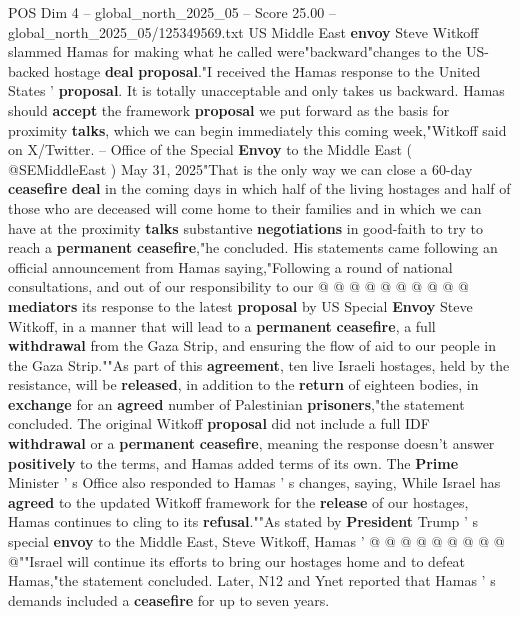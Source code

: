 \begin{textsample}{POS Dim 4 – global\_north\_2025\_05 – Score 25.00 – global\_north\_2025\_05/125349569.txt}  \label{ex:f4_pos_216}
US Middle East \textbf{envoy} Steve Witkoff slammed Hamas for making what he called were"backward"changes to the US-backed hostage \textbf{deal} \textbf{proposal}."I received the Hamas response to the United States ' \textbf{proposal}.
It is totally unacceptable and only takes us backward.
Hamas should \textbf{accept} the framework \textbf{proposal} we put forward as the basis for proximity \textbf{talks}, which we can begin immediately this coming week,"Witkoff said on X/Twitter. -- Office of the Special \textbf{Envoy} to the Middle East ( @SEMiddleEast ) May 31, 2025"That is the only way we can close a 60-day \textbf{ceasefire} \textbf{deal} in the coming days in which half of the living hostages and half of those who are deceased will come home to their families and in which we can have at the proximity \textbf{talks} substantive \textbf{negotiations} in good-faith to try to reach a \textbf{permanent} \textbf{ceasefire},"he concluded.
His statements came following an official announcement from Hamas saying,"Following a round of national consultations, and out of our responsibility to our @ @ @ @ @ @ @ @ @ @ \textbf{mediators} its response to the latest \textbf{proposal} by US Special \textbf{Envoy} Steve Witkoff, in a manner that will lead to a \textbf{permanent} \textbf{ceasefire}, a full \textbf{withdrawal} from the Gaza Strip, and ensuring the flow of aid to our people in the Gaza Strip.""As part of this \textbf{agreement}, ten live Israeli hostages, held by the resistance, will be \textbf{released}, in addition to the \textbf{return} of eighteen bodies, in \textbf{exchange} for an \textbf{agreed} number of Palestinian \textbf{prisoners},"the statement concluded.
The original Witkoff \textbf{proposal} did not include a full IDF \textbf{withdrawal} or a \textbf{permanent} \textbf{ceasefire}, meaning the response doesn't answer \textbf{positively} to the terms, and Hamas added terms of its own.
The \textbf{Prime} Minister ' s Office also responded to Hamas ' s changes, saying, While Israel has \textbf{agreed} to the updated Witkoff framework for the \textbf{release} of our hostages, Hamas continues to cling to its \textbf{refusal}.""As stated by \textbf{President} Trump ' s special \textbf{envoy} to the Middle East, Steve Witkoff, Hamas ' @ @ @ @ @ @ @ @ @ @""Israel will continue its efforts to bring our hostages home and to defeat Hamas,"the statement concluded.
Later, N12 and Ynet reported that Hamas ' s demands included a \textbf{ceasefire} for up to seven years.

\end{textsample}
